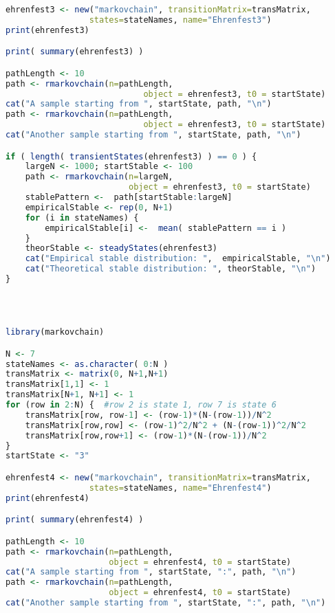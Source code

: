 \begin{description}
\begin{lstlisting}[language=R]
ehrenfest3 <- new("markovchain", transitionMatrix=transMatrix,
                 states=stateNames, name="Ehrenfest3")
print(ehrenfest3)

print( summary(ehrenfest3) )

pathLength <- 10 
path <- rmarkovchain(n=pathLength,
                            object = ehrenfest3, t0 = startState)
cat("A sample starting from ", startState, path, "\n")
path <- rmarkovchain(n=pathLength,
                            object = ehrenfest3, t0 = startState)
cat("Another sample starting from ", startState, path, "\n")

if ( length( transientStates(ehrenfest3) ) == 0 ) {
    largeN <- 1000; startStable <- 100
    path <- rmarkovchain(n=largeN,
                         object = ehrenfest3, t0 = startState)
    stablePattern <-  path[startStable:largeN]
    empiricalStable <- rep(0, N+1)
    for (i in stateNames) { 
        empiricalStable[i] <-  mean( stablePattern == i )
    }
    theorStable <- steadyStates(ehrenfest3)
    cat("Empirical stable distribution: ",  empiricalStable, "\n")
    cat("Theoretical stable distribution: ", theorStable, "\n")
}


  
\end{lstlisting}


\begin{lstlisting}[language=R]
library(markovchain)

N <- 7
stateNames <- as.character( 0:N )
transMatrix <- matrix(0, N+1,N+1)
transMatrix[1,1] <- 1
transMatrix[N+1, N+1] <- 1
for (row in 2:N) {  #row 2 is state 1, row 7 is state 6
    transMatrix[row, row-1] <- (row-1)*(N-(row-1))/N^2
    transMatrix[row,row] <- (row-1)^2/N^2 + (N-(row-1))^2/N^2
    transMatrix[row,row+1] <- (row-1)*(N-(row-1))/N^2
}
startState <- "3"

ehrenfest4 <- new("markovchain", transitionMatrix=transMatrix,
                 states=stateNames, name="Ehrenfest4")
print(ehrenfest4)

print( summary(ehrenfest4) )

pathLength <- 10 
path <- rmarkovchain(n=pathLength,
                     object = ehrenfest4, t0 = startState)
cat("A sample starting from ", startState, ":", path, "\n")
path <- rmarkovchain(n=pathLength,
                     object = ehrenfest4, t0 = startState)
cat("Another sample starting from ", startState, ":", path, "\n")


\end{lstlisting}
\end{description}
